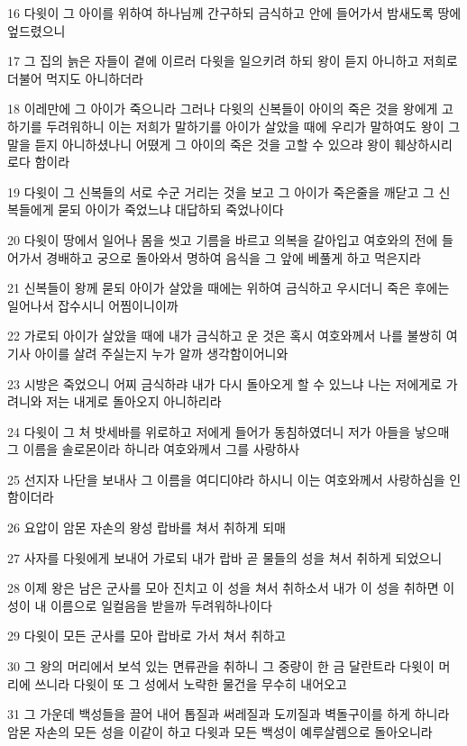 \par 16 다윗이 그 아이를 위하여 하나님께 간구하되 금식하고 안에 들어가서 밤새도록 땅에 엎드렸으니
\par 17 그 집의 늙은 자들이 곁에 이르러 다윗을 일으키려 하되 왕이 듣지 아니하고 저희로 더불어 먹지도 아니하더라
\par 18 이레만에 그 아이가 죽으니라 그러나 다윗의 신복들이 아이의 죽은 것을 왕에게 고하기를 두려워하니 이는 저희가 말하기를 아이가 살았을 때에 우리가 말하여도 왕이 그 말을 듣지 아니하셨나니 어뗬게 그 아이의 죽은 것을 고할 수 있으랴 왕이 훼상하시리로다 함이라
\par 19 다윗이 그 신복들의 서로 수군 거리는 것을 보고 그 아이가 죽은줄을 깨닫고 그 신복들에게 묻되 아이가 죽었느냐 대답하되 죽었나이다
\par 20 다윗이 땅에서 일어나 몸을 씻고 기름을 바르고 의복을 갈아입고 여호와의 전에 들어가서 경배하고 궁으로 돌아와서 명하여 음식을 그 앞에 베풀게 하고 먹은지라
\par 21 신복들이 왕께 묻되 아이가 살았을 때에는 위하여 금식하고 우시더니 죽은 후에는 일어나서 잡수시니 어찜이니이까
\par 22 가로되 아이가 살았을 때에 내가 금식하고 운 것은 혹시 여호와께서 나를 불쌍히 여기사 아이를 살려 주실는지 누가 알까 생각함이어니와
\par 23 시방은 죽었으니 어찌 금식하랴 내가 다시 돌아오게 할 수 있느냐 나는 저에게로 가려니와 저는 내게로 돌아오지 아니하리라
\par 24 다윗이 그 처 밧세바를 위로하고 저에게 들어가 동침하였더니 저가 아들을 낳으매 그 이름을 솔로몬이라 하니라 여호와께서 그를 사랑하사
\par 25 선지자 나단을 보내사 그 이름을 여디디야라 하시니 이는 여호와께서 사랑하심을 인함이더라
\par 26 요압이 암몬 자손의 왕성 랍바를 쳐서 취하게 되매
\par 27 사자를 다윗에게 보내어 가로되 내가 랍바 곧 물들의 성을 쳐서 취하게 되었으니
\par 28 이제 왕은 남은 군사를 모아 진치고 이 성을 쳐서 취하소서 내가 이 성을 취하면 이 성이 내 이름으로 일컬음을 받을까 두려워하나이다
\par 29 다윗이 모든 군사를 모아 랍바로 가서 쳐서 취하고
\par 30 그 왕의 머리에서 보석 있는 면류관을 취하니 그 중량이 한 금 달란트라 다윗이 머리에 쓰니라 다윗이 또 그 성에서 노략한 물건을 무수히 내어오고
\par 31 그 가운데 백성들을 끌어 내어 톱질과 써레질과 도끼질과 벽돌구이를 하게 하니라 암몬 자손의 모든 성을 이같이 하고 다윗과 모든 백성이 예루살렘으로 돌아오니라

